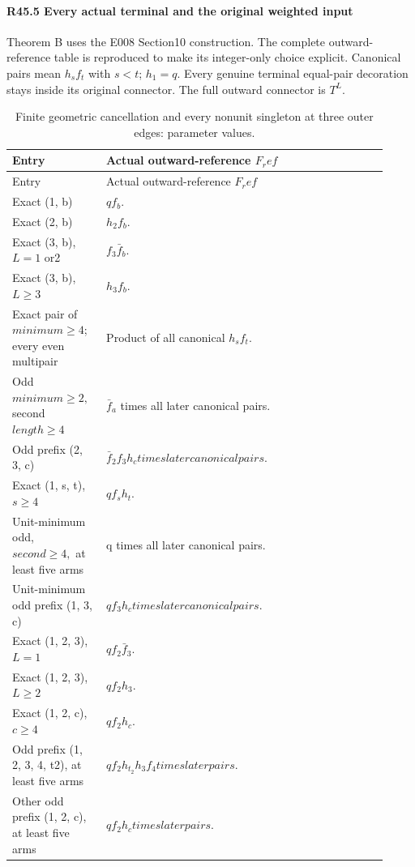 \paragraph{R45.5 Every actual terminal and the original weighted input}

Theorem B uses the E008 Section10 construction. The
complete outward-reference table is reproduced to make its integer-only
choice explicit. Canonical pairs mean \(h_s f_t\) with \(s<t\); \(h_{1}=q.\) Every
genuine terminal equal-pair decoration stays inside its original
connector. The full outward connector is \(T^L.\)


\begingroup\small
\setlength{\tabcolsep}{3pt}
\setlength{\LTleft}{0pt}\setlength{\LTright}{\fill}
\begin{longtable}{@{}p{0.2200\linewidth}p{0.7000\linewidth}@{}}
\caption{Finite geometric cancellation and every nonunit singleton at three outer edges: parameter values.}\label{tab:parameters:r2-c045:1}\\
\toprule
Entry & Actual outward-reference \(F_ref\) \\
\midrule\endfirsthead
\toprule
Entry & Actual outward-reference \(F_ref\) \\
\midrule\endhead
\bottomrule\endfoot
Exact (1, b) & \(q f_b\). \\
\addlinespace[2pt]
Exact (2, b) & \(h_{2} f_b\). \\
\addlinespace[2pt]
Exact (3, b), \(L=1\) or2 & \(f_{3} \bar f_b\). \\
\addlinespace[2pt]
Exact (3, b), \(L\ge 3\) & \(h_{3} f_b\). \\
\addlinespace[2pt]
Exact pair of \(minimum\ge 4\); every even multipair & Product of all canonical \(h_s f_t\). \\
\addlinespace[2pt]
Odd \(minimum\ge 2,\allowbreak \) second \(length\ge 4\) & \(\bar f_a\) times all later canonical pairs. \\
\addlinespace[2pt]
Odd prefix (2, 3, c) & \(\bar f_2 f_{3} h_c times later canonical pairs\). \\
\addlinespace[2pt]
Exact (1, s, t), \(s\ge 4\) & \(q f_s h_t\). \\
\addlinespace[2pt]
Unit-minimum odd, \(second\ge 4,\allowbreak \) at least five arms & q times all later canonical pairs. \\
\addlinespace[2pt]
Unit-minimum odd prefix (1, 3, c) & \(q f_{3} h_c times later canonical pairs\). \\
\addlinespace[2pt]
Exact (1, 2, 3), \(L=1\) & \(qf_2\bar f_3\). \\
\addlinespace[2pt]
Exact (1, 2, 3), \(L\ge 2\) & \(qf_2h_3\). \\
\addlinespace[2pt]
Exact (1, 2, c), \(c\ge 4\) & \(q f_{2} h_c\). \\
\addlinespace[2pt]
Odd prefix (1, 2, 3, 4, t2), at least five arms & \(q f_{2} h_{t_2} h_{3} f_{4} times later pairs\). \\
\addlinespace[2pt]
Other odd prefix (1, 2, c), at least five arms & \(q f_{2} h_c times later pairs\). \\
\end{longtable}
\endgroup


